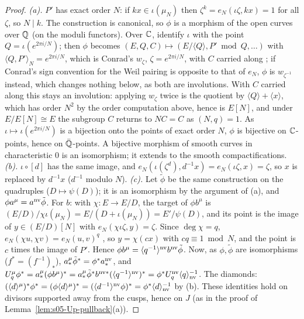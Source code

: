 \begin{proof}
\emph{(a).} $P'$ has exact order $N$: if $kx\in\iota(\mu_N)$ then $\zeta^k=e_N(\iota\zeta,kx)=1$ for all $\zeta$, so $N\mid k$. The construction is canonical,
so $\phi$ is a morphism of the open curves over $\mathbb{Q}$ (on the moduli functors). Over $\mathbb{C}$, identify $\iota$ with the point $Q=\iota(e^{2\pi i/N})$;
then $\phi$ becomes $(E,Q,C)\mapsto(E/\langle Q\rangle,P'\bmod Q,\ldots)$ with $\langle Q,P'\rangle_N=e^{2\pi i/N}$, which is Conrad's $w_\zeta$, $\zeta=e^{2\pi i/N}$,
with $C$ carried along ; if Conrad's sign convention for the Weil pairing is opposite to that of $e_N$, $\phi$ is
$w_{\zeta^{-1}}$ instead, which changes nothing below, as both are involutions. With $C$ carried along this stays an involution: applying $w_\zeta$ twice is the quotient by
$\langle Q\rangle+\langle x\rangle$, which has order $N^2$ by the order computation above, hence is $E[N]$, and under $E/E[N]\cong E$ the subgroup $C$
returns to $NC=C$ as $(N,q)=1$. As $\iota\mapsto\iota(e^{2\pi i/N})$ is a bijection onto the points of exact order $N$, $\phi$ is bijective on
$\mathbb{C}$-points, hence on $\bar{\mathbb{Q}}$-points. A bijective morphism of smooth curves in characteristic $0$
is an isomorphism; it extends to the smooth compactifications.
\emph{(b).} $\iota\circ[d]$ has the same image, and $e_N(\iota(\zeta^d),d^{-1}x)=e_N(\iota\zeta,x)=\zeta$, so $x$ is replaced by $d^{-1}x$ ($d^{-1}$ modulo $N$).
\emph{(c).} Let $\tilde\phi$ be the same construction on the quadruples ($D\mapsto\psi(D)$); it is an isomorphism by the argument of (a), and
$\phi a^\mu=a^{\rm nv}\tilde\phi$. For $b$: with $\chi:E\to E/D$, the target of $\phi b^\mu$ is $(E/D)/\chi\iota(\mu_N)=E/(D+\iota(\mu_N))=E'/\psi(D)$, and its point
is the image of $y\in(E/D)[N]$ with $e_N(\chi\iota\zeta,y)=\zeta$. Since $\deg\chi=q$, $e_N(\chi u,\chi v)=e_N(u,v)^q$ \stknown, so $y=\chi(cx)$ with
$cq\equiv1\bmod N$, and the point is $c$ times the image of $P'$. Hence $\phi b^\mu=\langle q^{-1}\rangle^{\rm nv}b^{\rm nv}\tilde\phi$. Now, as $\phi,\tilde\phi$ are
isomorphisms ($f^*=(f^{-1})_*$), $a^\mu_*\tilde\phi^*=\phi^*a^{\rm nv}_*$, and
$U^\mu_q\phi^*=a^\mu_*(\phi b^\mu)^*=a^\mu_*\tilde\phi^*b^{{\rm nv}*}(\langle q^{-1}\rangle^{\rm nv})^*=\phi^*U^{\rm nv}_q\langle q\rangle_{\rm nv}^{-1}$. The diamonds: $(\langle d\rangle^\mu)^*\phi^*=(\phi\langle d\rangle^\mu)^*=(\langle d^{-1}\rangle^{\rm nv}\phi)^*=\phi^*\langle d\rangle_{\rm nv}^{-1}$
by (b). These identities hold on divisors supported away from the cusps, hence on $J$ (as in the proof of Lemma~\ref{lem:s05-Up-pullback}(a)).
\end{proof}

